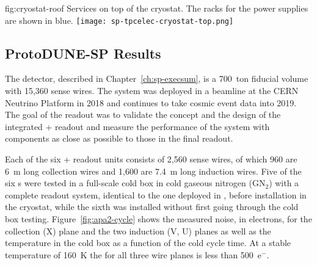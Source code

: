 \begin{dunefigure}
{fig:cryostat-roof}
{Services on top of the cryostat. The racks for the  power supplies are shown in blue.}
\texttt{[image: sp-tpcelec-cryostat-top.png]}
\end{dunefigure}

\subsection{ProtoDUNE-SP Results}
\label{sec:fdsp-tpcelec-overview-pdune}

The %
detector, described 
in Chapter~\ref{ch:sp-execsum}, is a 700~ton fiducial volume 
 with 15,360 sense wires. 
The system was deployed in a beamline at the CERN Neutrino Platform 
in 2018 and continues to take cosmic event data into 2019. The goal of 
the   readout was to validate the concept 
and the design of the integrated + readout 
and measure the performance of the  system with components 
as close as possible to those in the final   readout.


Each of the six  +
readout units consists of 2,560 sense wires, of which 960 are \SI{6}{m} 
long collection wires and 1,600 are \SI{7.4}{m} long induction wires. 
Five of the six s were tested in a full-scale cold box in 
cold gaseous nitrogen (GN$_2$) with a complete  readout system,  
identical to the one %
deployed in , before installation in the cryostat,
while the sixth %
 was installed without first going through the cold
box testing. Figure~\ref{fig:apa2-cycle} shows the measured noise, in 
electrons, for the collection (X) plane and the two induction (V, U) 
planes as well as the  temperature in the cold box as a 
function of the cold cycle time. At a stable temperature of 
\SI{160}{K} the  for all three wire planes is less than 500~e$^-$.

